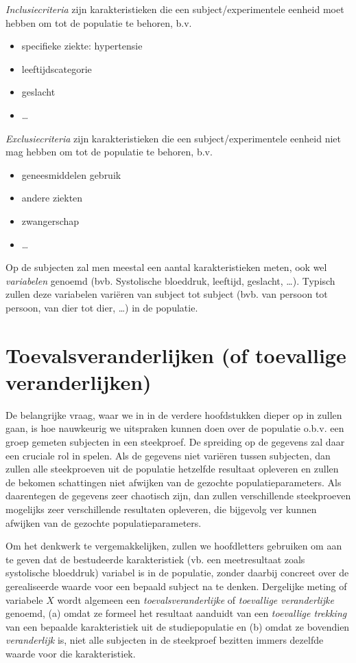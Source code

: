\documentclass[
  dutch,
  letterpaper,
  12pt]{book}
\providecommand{\tightlist}{%
  \setlength{\itemsep}{0pt}\setlength{\parskip}{0pt}}
\theoremstyle{definition}
\theoremstyle{definition}
\theoremstyle{definition}
\theoremstyle{remark}
\begin{document}
\emph{Inclusiecriteria} zijn karakteristieken die een
subject/experimentele eenheid moet hebben om tot de populatie te
behoren, b.v.

\begin{itemize}
\tightlist
\item
  specifieke ziekte: hypertensie
\item
  leeftijdscategorie
\item
  geslacht
\item
  \ldots{}
\end{itemize}

\emph{Exclusiecriteria} zijn karakteristieken die een
subject/experimentele eenheid niet mag hebben om tot de populatie te
behoren, b.v.

\begin{itemize}
\tightlist
\item
  geneesmiddelen gebruik
\item
  andere ziekten
\item
  zwangerschap
\item
  \ldots{}
\end{itemize}

Op de subjecten zal men meestal een aantal karakteristieken meten, ook
wel \emph{variabelen} genoemd (bvb. Systolische bloeddruk, leeftijd,
geslacht, \ldots). Typisch zullen deze variabelen variëren van subject
tot subject (bvb. van persoon tot persoon, van dier tot dier, \ldots) in
de populatie.

\section{Toevalsveranderlijken (of toevallige
veranderlijken)}\label{toevalsveranderlijken-of-toevallige-veranderlijken}

De belangrijke vraag, waar we in in de verdere hoofdstukken dieper op in
zullen gaan, is hoe nauwkeurig we uitspraken kunnen doen over de
populatie o.b.v. een groep gemeten subjecten in een steekproef. De
spreiding op de gegevens zal daar een cruciale rol in spelen. Als de
gegevens niet variëren tussen subjecten, dan zullen alle steekproeven
uit de populatie hetzelfde resultaat opleveren en zullen de bekomen
schattingen niet afwijken van de gezochte populatieparameters. Als
daarentegen de gegevens zeer chaotisch zijn, dan zullen verschillende
steekproeven mogelijks zeer verschillende resultaten opleveren, die
bijgevolg ver kunnen afwijken van de gezochte populatieparameters.

Om het denkwerk te vergemakkelijken, zullen we hoofdletters gebruiken om
aan te geven dat de bestudeerde karakteristiek (vb. een meetresultaat
zoals systolische bloeddruk) variabel is in de populatie, zonder daarbij
concreet over de gerealiseerde waarde voor een bepaald subject na te
denken. Dergelijke meting of variabele \(X\) wordt algemeen een
\emph{toevalsveranderlijke} of \emph{toevallige veranderlijke} genoemd,
(a) omdat ze formeel het resultaat aanduidt van een \emph{toevallige
trekking} van een bepaalde karakteristiek uit de studiepopulatie en (b)
omdat ze bovendien \emph{veranderlijk} is, niet alle subjecten in de
steekproef bezitten immers dezelfde waarde voor die karakteristiek.
\end{document}
